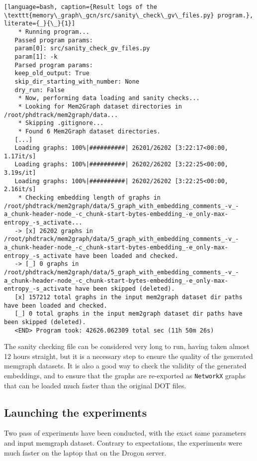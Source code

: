 \begin{lstlisting}[language=bash, caption={Result logs of the \texttt{memory\_graph\_gcn/src/sanity\_check\_gv\_files.py} program.}, literate={_}{\_}{1}]
    * Running program...
   Passed program params:
   param[0]: src/sanity_check_gv_files.py
   param[1]: -k
   Parsed program params:
   keep_old_output: True
   skip_dir_starting_with_number: None
   dry_run: False
    * Now, performing data loading and sanity checks...
    * Looking for Mem2Graph dataset directories in /root/phdtrack/mem2graph/data...
    * Skipping .gitignore...
    * Found 6 Mem2Graph dataset directories.
   [...]
   Loading graphs: 100%|##########| 26201/26202 [3:22:17<00:00,  1.17it/s]
   Loading graphs: 100%|##########| 26202/26202 [3:22:25<00:00,  3.19s/it]
   Loading graphs: 100%|##########| 26202/26202 [3:22:25<00:00,  2.16it/s]
    * Checking embedding length of graphs in /root/phdtrack/mem2graph/data/5_graph_with_embedding_comments_-v_-a_chunk-header-node_-c_chunk-start-bytes-embedding_-e_only-max-entropy_-s_activate...
   -> [x] 26202 graphs in /root/phdtrack/mem2graph/data/5_graph_with_embedding_comments_-v_-a_chunk-header-node_-c_chunk-start-bytes-embedding_-e_only-max-entropy_-s_activate have been loaded and checked.
   -> [_] 0 graphs in /root/phdtrack/mem2graph/data/5_graph_with_embedding_comments_-v_-a_chunk-header-node_-c_chunk-start-bytes-embedding_-e_only-max-entropy_-s_activate have been skipped (deleted).
   [x] 157212 total graphs in the input mem2graph dataset dir paths have been loaded and checked.
   [_] 0 total graphs in the input mem2graph dataset dir paths have been skipped (deleted).
   <END> Program took: 42626.062309 total sec (11h 50m 26s)
\end{lstlisting}

The sanity checking file can be considered very long to run, having taken almost 12 hours straight, but it is a necessary step to ensure the quality of the generated memgraph datasets. It is also a good way to check the validity of the generated embeddings, and to ensure that the graphs are re-exported as \texttt{NetworkX} graphs that can be loaded much faster than the original DOT files.

\subsection{Launching the experiments}
Two pass of experiments have been conducted, with the exact same parameters and input memgraph dataset. Contrary to expectations, the experiments were much faster on the laptop that on the Drogon server. 

